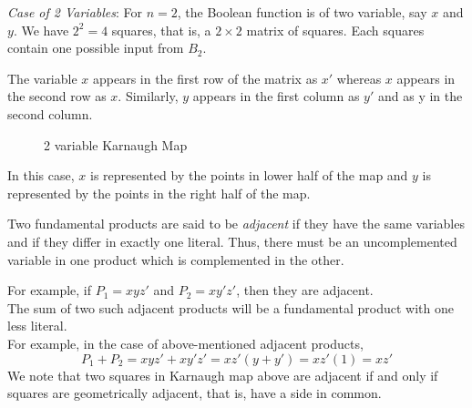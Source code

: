\documentclass[../main-sheet.tex]{subfiles}
\begin{document}
\emph{Case of 2 Variables}: For $ n = 2 $, the Boolean function is of two variable, say $ x $ and $ y $. We have $ 2^2 = 4 $ squares, that is, a $ 2 \times 2 $ matrix of squares. Each squares contain one possible input from $ B_2 $.

The variable $ x  $ appears in the first row of the matrix as $ x' $ whereas $ x $ appears in the second row as $ x $. Similarly, $ y $ appears in the first column as $ y' $ and as y in the second column.
\begin{figure}[H]
    \centering
        \caption{2 variable Karnaugh Map}
\end{figure}
In this case, $ x $ is represented by the points in lower half of the map and $ y $ is represented by the points in the right half of the map.
\begin{defn}
    Two fundamental products are said to be \emph{adjacent} if they have the same variables and if they differ in exactly one literal. Thus, there must be an uncomplemented variable in one product which is complemented in the other.
\end{defn}
For example, if $ P_1 = x y z' $ and $ P_2 = x y' z'  $, then they are adjacent.\\
The sum of two such adjacent products will be a fundamental product with one less literal.\\
For example, in the case of above-mentioned adjacent products,
\[
    P_1+P_2=xyz'+xy'z'=xz'(y+y')=xz'(1)=xz'
\]
We note that two squares in Karnaugh map above are adjacent if and only if squares are geometrically adjacent, that is, have a side in common.
\end{document}
